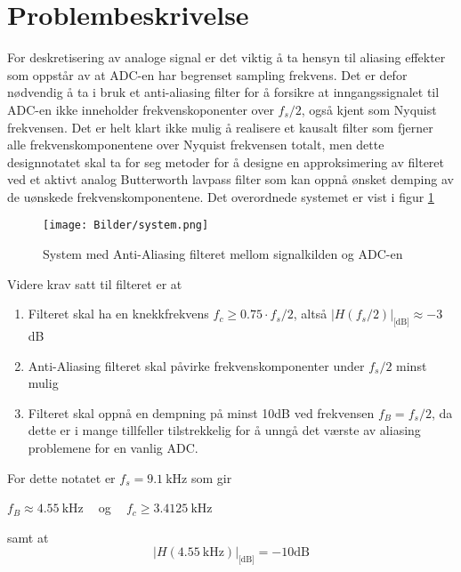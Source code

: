 \section{Problembeskrivelse}
\label{problemBeskrivelse}

For deskretisering av analoge signal er det viktig å ta hensyn til aliasing effekter som oppstår av at ADC-en har begrenset
sampling frekvens. Det er defor nødvendig å ta i bruk et anti-aliasing filter for å forsikre at inngangssignalet til ADC-en 
ikke inneholder frekvenskoponenter over $f_s / 2$, også kjent som Nyquist frekvensen. Det er helt klart ikke mulig å realisere et 
kausalt filter som fjerner alle frekvenskomponentene over Nyquist frekvensen totalt, men dette designnotatet skal ta for seg 
metoder for å designe en approksimering av filteret ved et aktivt analog Butterworth lavpass filter
som kan oppnå ønsket demping av de uønskede frekvenskomponentene. Det overordnede systemet er vist i figur \ref{system-figure}
\begin{figure}[H]
    \centering
    \texttt{[image: Bilder/system.png]}
    \caption{System med Anti-Aliasing filteret mellom signalkilden og ADC-en \cite{problembeskrivelse}}
    \label{system-figure}
\end{figure}

Videre krav satt til filteret er at 
\begin{enumerate}
    \item Filteret skal ha en knekkfrekvens $f_c \geq 0.75 \cdot f_s / 2$, altså $|H(f_s/2)|_{\text{[dB]}} \approx -3$dB
    \item Anti-Aliasing filteret skal påvirke frekvenskomponenter under $f_s/2$ minst mulig
    \item Filteret skal oppnå en dempning på minst 10dB ved frekvensen $f_B = f_s / 2$, da dette er i mange tillfeller 
        tilstrekkelig for å unngå det værste av aliasing problemene for en vanlig ADC.
\end{enumerate}

For dette notatet er $f_s = \SI{9.1}{\kilo\hertz}$ som gir 
\begin{center}
    $f_B \approx \SI{4.55}{\kilo\hertz}\:\:\:\:$ og $\:\:\:\:f_c \geq \SI{3.4125}{\kilo\hertz}$
\end{center}
samt at 
\[
    |H(\SI{4.55}{\kilo\hertz})|_{\text{[dB]}} = -10\text{dB}
\]
